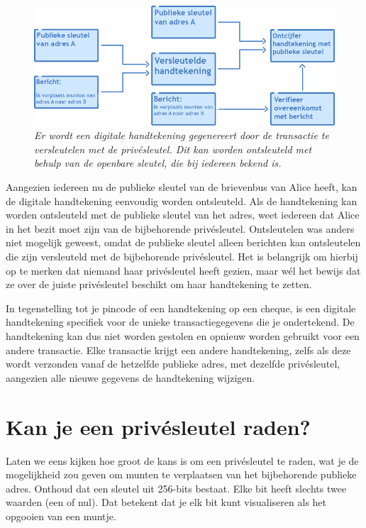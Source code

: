 \documentclass[smalldemyvopaper,11pt,twoside,onecolumn,openright,extrafontsizes]{memoir}
\begin{document}
\begin{figure}
    \centering
    \includegraphics[width=\textwidth]{images/fig13.png}
    \caption{\footnotesize{\textit{Er wordt een digitale handtekening gegenereert door de transactie te versleutelen met de privésleutel. Dit kan worden ontsleuteld met behulp van de openbare sleutel, die bij iedereen bekend is.}}}
    \label{fig13}
\end{figure}

Aangezien iedereen nu de publieke sleutel van de brievenbus van Alice heeft, kan de digitale handtekening eenvoudig worden ontsleuteld. Als de handtekening kan worden ontsleuteld met de publieke sleutel van het adres, weet iedereen dat Alice in het bezit moet zijn van de bijbehorende privésleutel. Ontsleutelen was anders niet mogelijk geweest, omdat de publieke sleutel alleen berichten kan ontsleutelen die zijn versleuteld met de bijbehorende privésleutel. Het is belangrijk om hierbij op te merken dat niemand haar privésleutel heeft gezien, maar wél het bewijs dat ze over de juiste privésleutel beschikt om haar handtekening te zetten.

In tegenstelling tot je pincode of een handtekening op een cheque, is een digitale handtekening specifiek voor de unieke transactiegegevens die je ondertekend. De handtekening kan dus niet worden gestolen en opnieuw worden gebruikt voor een andere transactie. Elke transactie krijgt een andere handtekening, zelfs als deze wordt verzonden vanaf de hetzelfde publieke adres, met dezelfde privésleutel, aangezien alle nieuwe gegevens de handtekening wijzigen.


\section[Kan je een privésleutel raden?]{Kan je een privésleutel raden?}

Laten we eens kijken hoe groot de kans is om een privésleutel te raden, wat je de mogelijkheid zou geven om munten te verplaatsen van het bijbehorende publieke adres. Onthoud dat een sleutel uit 256-bits bestaat. Elke bit heeft slechts twee waarden (een of nul). Dat betekent dat je elk bit kunt visualiseren als het opgooien van een muntje.
\end{document}
